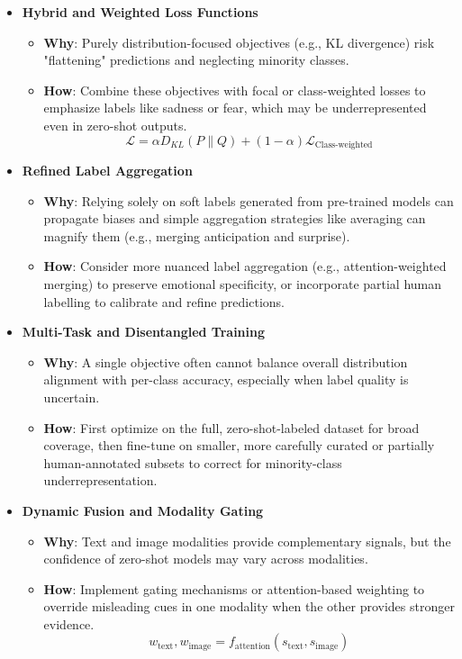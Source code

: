 \begin{itemize}
    \item \textbf{Hybrid and Weighted Loss Functions}
    \begin{itemize}
        \item \textbf{Why}: Purely distribution-focused objectives (e.g., KL divergence) risk "flattening" predictions and neglecting minority classes.
        \item \textbf{How}: Combine these objectives with focal or class-weighted losses to emphasize labels like sadness or fear, which may be underrepresented even in zero-shot outputs.
        \begin{equation}
            \mathcal{L} = \alpha D_{KL}(P \parallel Q) + (1-\alpha)\mathcal{L}_{\text{Class-weighted}}
        \end{equation}
    \end{itemize}
    
    \item \textbf{Refined Label Aggregation}
    \begin{itemize}
        \item \textbf{Why}: Relying solely on soft labels generated from pre-trained models can propagate biases and simple aggregation strategies like averaging can magnify them (e.g., merging anticipation and surprise).
        \item \textbf{How}: Consider more nuanced label aggregation (e.g., attention-weighted merging) to preserve emotional specificity, or incorporate partial human labelling to calibrate and refine predictions.
    \end{itemize}
    
    \item \textbf{Multi-Task and Disentangled Training}
    \begin{itemize}
        \item \textbf{Why}: A single objective often cannot balance overall distribution alignment with per-class accuracy, especially when label quality is uncertain.
        \item \textbf{How}: First optimize on the full, zero-shot-labeled dataset for broad coverage, then fine-tune on smaller, more carefully curated or partially human-annotated subsets to correct for minority-class underrepresentation.
    \end{itemize}
    
    \item \textbf{Dynamic Fusion and Modality Gating}
    \begin{itemize}
        \item \textbf{Why}: Text and image modalities provide complementary signals, but the confidence of zero-shot models may vary across modalities.
        \item \textbf{How}: Implement gating mechanisms or attention-based weighting to override misleading cues in one modality when the other provides stronger evidence.
        \begin{equation}
            w_{\text{text}}, w_{\text{image}} = f_{\text{attention}}(s_{\text{text}}, s_{\text{image}})
        \end{equation}
    \end{itemize}
    

\end{itemize}
